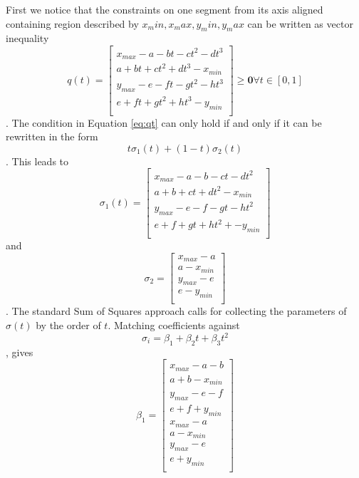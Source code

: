 First we notice that the constraints on one segment from its axis aligned containing region described by $x_min, x_max, y_min, y_max$ can be written as vector inequality
\begin{equation}
 q(t) = \left[\begin{array}{c}
 x_{max} - a - bt - ct^2 - dt^3 \\ 
 a + bt+ ct^2 + dt^3 - x_{min} \\
 y_{max} - e - ft - gt^2 - ht^3 \\ 
 e + ft+ gt^2 + ht^3 - y_{min} \\
 \end{array}\right] \geq \bm{0} \forall t \in [0,1]
 \label{eq:qt}
 \end{equation}
. The condition in Equation \ref{eq:qt} can only hold if and only if it can be rewritten in the form
\begin{equation}
t\sigma_1(t) + (1-t)\sigma_2(t)
\end{equation}
. This leads to 
\begin{equation}
\sigma_1(t) = \left[\begin{array}{c}
	x_{max} - a- b- ct- dt^2 \\
	a + b+ ct+ dt^2 - x_{min} \\
	y_{max} - e - f - gt - ht^2 \\
	e + f+ gt+ ht^2 +-y_{min} \\
	\end{array}\right]
\end{equation}
and 
\begin{equation}
\sigma_2 = \left[\begin{array}{c}
x_{max} -a \\
a - x_{min} \\
y_{max} - e \\
e - y_{min} \\
\end{array}\right]
\end{equation}. 
The standard Sum of Squares approach calls for collecting the parameters of $\sigma(t)$ by the order of $t$. Matching coefficients against
\begin{equation}
\sigma_i = \beta_1 + \beta_2 t + \beta_3 t^2
\end{equation}, gives
\begin{equation}
\beta_1 = \left[\begin{array}{c}
x_{max} - a - b \\
a + b - x_{min} \\
y_{max} - e - f \\
e + f + y_{min} \\
x_{max} - a \\
a - x_{min} \\
y_{max} - e \\
e + y_{min} \\
\end{array}\right]
\end{equation}
